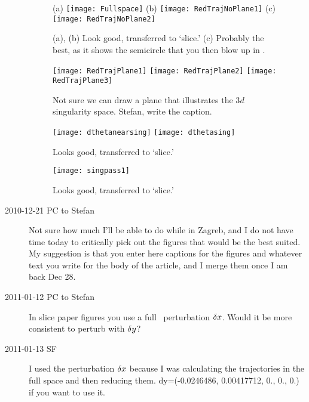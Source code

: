 \begin{description}
 \begin{figure}
 (a) \texttt{[image: Fullspace]}%
 (b) \texttt{[image: RedTrajNoPlane1]}%
 (c) \texttt{[image: RedTrajNoPlane2]}%
 \caption{\label{fig:Fullspace}
(a), (b) Look good, transferred to `slice.'
(c) Probably the best, as it shows the semicircle that you then
blow up in .
 }%
 \end{figure}

 \begin{figure}
 \texttt{[image: RedTrajPlane1]}%
 \texttt{[image: RedTrajPlane2]}%
 \texttt{[image: RedTrajPlane3]}%
 \caption{\label{fig:RedTrajPlane1}
Not sure we can draw a plane that illustrates the
3$d$ singularity space.
Stefan, write the caption.
 }%
 \end{figure}

 \begin{figure}
 \texttt{[image: dthetanearsing]}%
 \texttt{[image: dthetasing]}%
 \caption{\label{fig:dthetanearsing}
Looks good, transferred to `slice.'
 }%
 \end{figure}

 \begin{figure}
 \texttt{[image: singpass1]}%
 \caption{\label{fig:singpass1}
Looks good, transferred to `slice.'
 }%
 \end{figure}

\item[2010-12-21 PC to Stefan] Not sure how much I'll be able to do while
in Zagreb, and I do not have time today to critically pick out the
figures that would be the best suited. My suggestion is that you enter
here captions for the figures and whatever text you write for the body of
the article, and I merge them once I am back Dec 28.

\item[2011-01-12 PC to Stefan]
In slice paper figures
you use a full \statesp\ perturbation $\delta x$. Would it be more consistent
to perturb with $\delta y$?

\item[2011-01-13 SF]
I used the perturbation $\delta x$ because I was calculating
    the trajectories in the full space and then reducing them.
    dy=(-0.0246486, 0.00417712, 0., 0., 0.) if you want to use it.


\end{description}
